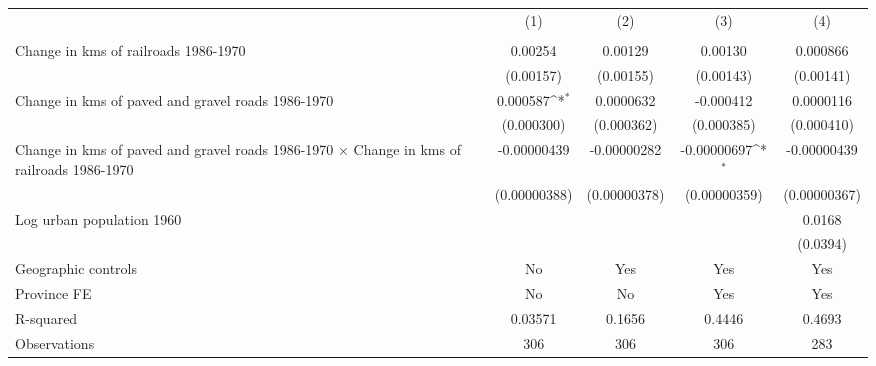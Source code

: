{
\def\sym#1{\ifmmode^{#1}\else\(^{#1}\)\fi}
\begin{tabular}{l*{4}{c}}
\hline\hline
                &\multicolumn{1}{c}{(1)}&\multicolumn{1}{c}{(2)}&\multicolumn{1}{c}{(3)}&\multicolumn{1}{c}{(4)}\\
                &\multicolumn{1}{c}{}&\multicolumn{1}{c}{}&\multicolumn{1}{c}{}&\multicolumn{1}{c}{}\\
\hline
Change in kms of railroads 1986-1970&  0.00254         &  0.00129         &  0.00130         & 0.000866         \\
                &(0.00157)         &(0.00155)         &(0.00143)         &(0.00141)         \\
[1em]
Change in kms of paved and gravel roads 1986-1970& 0.000587\sym{*}  &0.0000632         &-0.000412         &0.0000116         \\
                &(0.000300)         &(0.000362)         &(0.000385)         &(0.000410)         \\
[1em]
Change in kms of paved and gravel roads 1986-1970 $\times$ Change in kms of railroads 1986-1970&-0.00000439         &-0.00000282         &-0.00000697\sym{*}  &-0.00000439         \\
                &(0.00000388)         &(0.00000378)         &(0.00000359)         &(0.00000367)         \\
[1em]
Log urban population 1960&                  &                  &                  &   0.0168         \\
                &                  &                  &                  & (0.0394)         \\
\hline
Geographic controls&       No         &      Yes         &      Yes         &      Yes         \\
Province FE     &       No         &       No         &      Yes         &      Yes         \\
R-squared       &  0.03571         &   0.1656         &   0.4446         &   0.4693         \\
Observations    &      306         &      306         &      306         &      283         \\
\hline\hline
\end{tabular}
}
